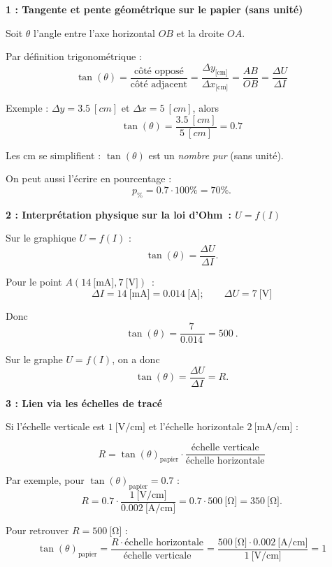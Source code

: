 \documentclass[a4paper,11pt,answers,addpoints]{exam}
\begin{document}
\begin{questions}
\begin{solution}
\begin{center}
\end{center}


\label{expl:pente}\question \textbf{1 : Tangente et pente géométrique sur le papier (sans unité)}

Soit $\theta$ l'angle entre l'axe horizontal $OB$ et la droite $OA$.

Par définition trigonométrique :
\[
\tan(\theta) = \frac{\text{côté opposé}}{\text{côté adjacent}}
= \frac{\Delta y_{\text{[cm]}}}{\Delta x_{\text{[cm]}}} = \dfrac{AB}{OB} = \dfrac{\Delta U}{\Delta I}
\]

Exemple : $\Delta y = \qty{3,5}{\unit{[cm]}}$ et $\Delta x = \qty{5}{[cm]}$, alors
\[
\tan(\theta) = \frac{\qty{3,5}{[cm]}}{\qty{5}{[cm]}} = \num{0.7}
\]

Les cm se simplifient : $\tan(\theta)$ est un \emph{nombre pur} (sans unité).

On peut aussi l'écrire en pourcentage :
\[
p_{\%} = \num{0.7} \cdot 100\% = 70\%.
\]

\vspace{0.5em}
\textbf{2 : Interprétation physique sur la loi d'Ohm~: $U = f(I)$}

Sur le graphique $U = f(I)$ :
\[
\tan(\theta) = \frac{\Delta U}{\Delta I}.
\]

Pour le point $A(\qty{14}{[\milli\ampere]},\qty{7}{[\volt]})$~:
\[
\Delta I = \qty{14}{[\milli\ampere]} = \qty{0,014}{[\ampere]}; \qquad
\Delta U = \qty{7}{[\volt]}
\]

Donc
\[
\tan(\theta) = \frac{\qty{7}{}}{\qty{0,014}{}} = \qty{500}{}.
\]

Sur le graphe $U = f(I)$, on a donc
\[
\tan(\theta) = \frac{\Delta U}{\Delta I} = R.
\]

\medskip
\textbf{3 : Lien via les échelles de tracé}

Si l’échelle verticale est $1\ \text{[V/cm]}$ et l’échelle horizontale $2\ \text{[mA/cm]}$ :

\[
R = \tan(\theta)_{\text{papier}} \cdot
\frac{\text{échelle verticale}}{\text{échelle horizontale}}
\]

Par exemple, pour $\tan(\theta)_{\text{papier}} = \num{0.7}$ :
\[
R = \num{0.7} \cdot \frac{1\ \text{[V/cm]}}{\num{0,002}\ \text{[A/cm]}}
= \num{0.7} \cdot 500\ \unit{[\ohm]}
= 350\ \unit{[\ohm]}.
\]

Pour retrouver $R = 500\ \unit{[\ohm]}$ :
\[
\tan(\theta)_{\text{papier}} =
\frac{R \cdot \text{échelle horizontale}}{\text{échelle verticale}}
= \frac{500\ \unit{[\ohm]} \cdot \num{0,002}\ \text{[A/cm]}}{1\ \text{[V/cm]}} = 1
\]


\end{solution}
\end{questions}
\end{document}
